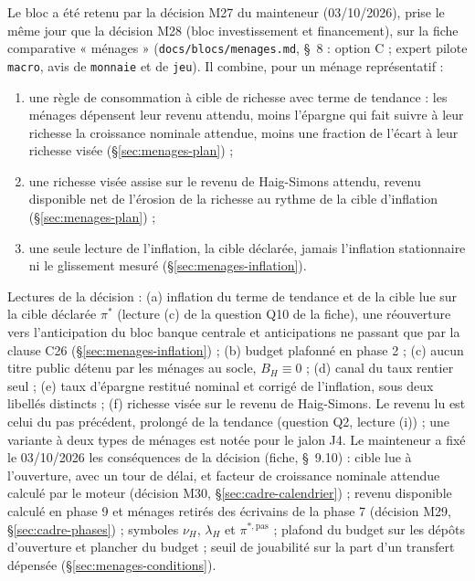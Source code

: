 \documentclass[11pt,a4paper]{article}
\begin{document}
\begin{proposee}
Le bloc a été retenu par la décision M27 du mainteneur (03/10/2026), prise le même jour que la décision M28 (bloc investissement et financement), sur la fiche comparative « ménages » (\nolinkurl{docs/blocs/menages.md}, \S~8 : option C ; expert pilote \texttt{macro}, avis de \texttt{monnaie} et de \texttt{jeu}). Il combine, pour un ménage représentatif :
\begin{enumerate}[label=(\alph*)]
\item une règle de consommation à cible de richesse avec terme de tendance : les ménages dépensent leur revenu attendu, moins l'épargne qui fait suivre à leur richesse la croissance nominale attendue, moins une fraction de l'écart à leur richesse visée (\S\ref{sec:menages-plan}) ;
\item une richesse visée assise sur le revenu de Haig-Simons attendu, revenu disponible net de l'érosion de la richesse au rythme de la cible d'inflation (\S\ref{sec:menages-plan}) ;
\item une seule lecture de l'inflation, la cible déclarée, jamais l'inflation stationnaire ni le glissement mesuré (\S\ref{sec:menages-inflation}).
\end{enumerate}
Lectures de la décision : (a) inflation du terme de tendance et de la cible lue sur la cible déclarée $\pi^\ast$ (lecture (c) de la question Q10 de la fiche), une réouverture vers l'anticipation du bloc banque centrale et anticipations ne passant que par la clause C26 (\S\ref{sec:menages-inflation}) ; (b) budget plafonné en phase 2 ; (c) aucun titre public détenu par les ménages au socle, $B_H \equiv 0$ ; (d) canal du taux rentier seul ; (e) taux d'épargne restitué nominal et corrigé de l'inflation, sous deux libellés distincts ; (f) richesse visée sur le revenu de Haig-Simons. Le revenu lu est celui du pas précédent, prolongé de la tendance (question Q2, lecture (i)) ; une variante à deux types de ménages est notée pour le jalon J4. Le mainteneur a fixé le 03/10/2026 les conséquences de la décision (fiche, \S~9.10) : cible lue à l'ouverture, avec un tour de délai, et facteur de croissance nominale attendue calculé par le moteur (décision M30, \S\ref{sec:cadre-calendrier}) ; revenu disponible calculé en phase 9 et ménages retirés des écrivains de la phase 7 (décision M29, \S\ref{sec:cadre-phases}) ; symboles $\nu_H$, $\lambda_H$ et $\pi^{\ast,\mathrm{pas}}$ ; plafond du budget sur les dépôts d'ouverture et plancher du budget ; seuil de jouabilité sur la part d'un transfert dépensée (\S\ref{sec:menages-conditions}).


\end{proposee}
\end{document}

